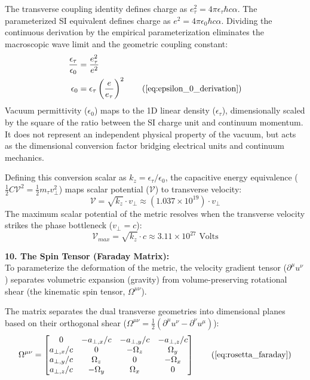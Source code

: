 The transverse coupling identity defines charge as $e_{\tau}^2 = 4\pi \epsilon_{\tau} \hbar c \alpha$. The parameterized SI equivalent defines charge as $e^2 = 4\pi \epsilon_0 \hbar c \alpha$. Dividing the continuous derivation by the empirical parameterization eliminates the macroscopic wave limit and the geometric coupling constant:
\begin{align}
    \frac{\epsilon_{\tau}}{\epsilon_0} &= \frac{e_{\tau}^2}{e^2} \nonumber \\
    \epsilon_0 &= \epsilon_{\tau} \left( \frac{e}{e_{\tau}} \right)^2 \tag{\ref{eq:epsilon_0_derivation}}
\end{align}
Vacuum permittivity ($\epsilon_0$) maps to the 1D linear density ($\epsilon_{\tau}$), dimensionally scaled by the square of the ratio between the SI charge unit and continuum momentum. It does not represent an independent physical property of the vacuum, but acts as the dimensional conversion factor bridging electrical units and continuum mechanics. 

Defining this conversion scalar as $k_z = \epsilon_{\tau}/\epsilon_0$, the capacitive energy equivalence ($\frac{1}{2} C \mathcal{V}^2 = \frac{1}{2} m_\tau v_{\perp}^2$) maps scalar potential ($\mathcal{V}$) to transverse velocity:
\begin{equation}
    \mathcal{V} = \sqrt{k_z} \cdot v_{\perp} \approx (1.037 \times 10^{19}) \cdot v_{\perp} 
\end{equation}
The maximum scalar potential of the metric resolves when the transverse velocity strikes the phase bottleneck ($v_{\perp} = c$):
\begin{equation}
    \mathcal{V}_{max} = \sqrt{k_z} \cdot c \approx 3.11 \times 10^{27} \text{ Volts} \label{eq:universal_voltage_b}
\end{equation}

\textbf{10. The Spin Tensor (Faraday Matrix):} \\
To parameterize the deformation of the metric, the velocity gradient tensor ($\partial^\mu u^\nu$) separates volumetric expansion (gravity) from volume-preserving rotational shear (the kinematic spin tensor, $\Omega^{\mu\nu}$). 

The matrix separates the dual transverse geometries into dimensional planes based on their orthogonal shear ($\Omega^{\mu\nu} = \frac{1}{2}(\partial^\mu u^\nu - \partial^\nu u^\mu)$): 
\begin{equation}
    \Omega^{\mu\nu} = \begin{bmatrix} 
    0 & -a_{\perp,x}/c & -a_{\perp,y}/c & -a_{\perp,z}/c \\ 
    a_{\perp,x}/c & 0 & -\Omega_z & \Omega_y \\ 
    a_{\perp,y}/c & \Omega_z & 0 & -\Omega_x \\ 
    a_{\perp,z}/c & -\Omega_y & \Omega_x & 0 
    \end{bmatrix} \tag{\ref{eq:rosetta_faraday}}
\end{equation}

